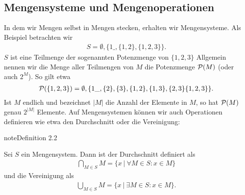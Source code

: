 \documentclass[letterpaper,10pt,english]{jupyterBook}
\begin{document}
\subsection{Mengensysteme und Mengenoperationen}
\label{\detokenize{grundlagen/mengenlogik:mengensysteme-und-mengenoperationen}}
In dem wir Mengen selbst in Mengen stecken, erhalten wir Mengensysteme. Als Beispiel betrachten wir
\begin{equation*}
\begin{split} S = \emptyset,\{1\_,\{1,2\},\{1,2,3\} \}.\end{split}
\end{equation*}
\(S\) ist eine Teilmenge der sogenannten Potenzmenge von \(\{1,2,3\}\) Allgemein nennen wir die Menge aller Teilmengen von \(M\) die Potenzmenge \({\cal P}(M)\) (oder auch \(2^M\)). So gilt etwa
\begin{equation*}
\begin{split} {\cal P}(\{1,2,3\}) = \emptyset,\{1\_,\{2\},\{3\},\{1,2\},\{1,3\},\{2,3\}\{1,2,3\} \}.\end{split}
\end{equation*}
Ist \(M\) endlich und bezeichnet \(\vert M \vert\) die Anzahl der Elemente in \(M\), so hat \({\cal P}(M)\) genau \(2^{\vert M \vert}\) Elemente.
Auf Mengensystemen können wir auch Operationen definieren wie etwa den Durchschnitt oder die Vereinigung:
\label{grundlagen/mengenlogik:definition-1}
\begin{sphinxadmonition}{note}{Definition 2.2}



Sei \(S\) ein Mengensystem. Dann ist der Durchschnitt definiert als
\begin{equation*}
\begin{split} \bigcap_{M \in S} M = \{x ~|~ \forall M \in S: x \in M \}\end{split}
\end{equation*}
und die Vereinigung als
\begin{equation*}
\begin{split} \bigcup_{M \in S} M = \{x ~|~ \exists M \in S: x \in M \}.\end{split}
\end{equation*}\end{sphinxadmonition}
\end{document}
